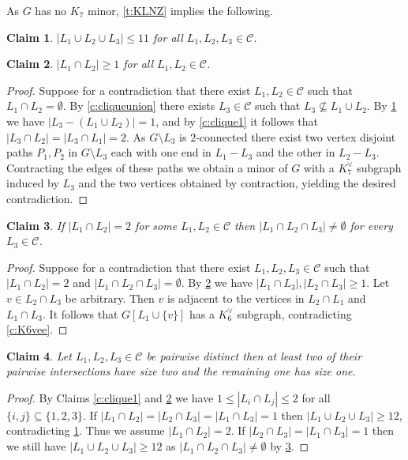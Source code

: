 \documentclass[reqno,final,12pt]{amsart}
\newtheorem{claim}{Claim}[section]
\newcommand{\mc}[1]{\mathcal{#1}}
\begin{document}
{As $G$ has no $K_7$ minor, \cref{t:KLNZ} implies the following.

\begin{claim}\label{c:klnz}  $|L_1 \cup L_2 \cup L_3| \leq 11$ for all $L_1,L_2,L_3 \in \mc{C}$.
\end{claim}	

\begin{claim}\label{c:clique2}  $|L_1 \cap L_2| \geq 1$ for all $L_1,L_2 \in \mc{C}$. 
\end{claim}	
\begin{proof}
Suppose for a contradiction that there exist $L_1,L_2 \in \mc{C}$ such that $L_1 \cap L_2 = \emptyset$. By \cref{c:cliqueunion} there exists $L_3 \in \mc{C}$ such that $L_3 \not \subseteq L_1 \cup L_2$. By \cref{c:klnz} we have $|L_3 - (L_1 \cup L_2)| =1$, and by \cref{c:clique1} it follows that $|L_3 \cap L_2|=|L_3 \cap L_1|=2$. As $G \setminus L_3$ is $2$-connected there exist two vertex disjoint paths $P_1,P_2$ in  $G \setminus L_3$ each with one end in $L_1 - L_3$ and the other in $L_2 - L_3$. Contracting the edges of these paths we obtain a minor of $G$ with a $K_7^{\vee}$ subgraph induced by $L_3$ and the two vertices obtained by contraction, yielding the desired contradiction. 	 
\end{proof}	


\begin{claim}\label{c:clique3} If $|L_1 \cap L_2| = 2$ for some $L_1,L_2 \in \mc{C}$ then $|L_1 \cap L_2 \cap L_3| \neq \emptyset$ for every $L_3 \in \mc{C}$.
\end{claim}	
\begin{proof}
	Suppose for a contradiction that there exist $L_1,L_2,L_3 \in \mc{C}$ such that $|L_1 \cap L_2|=2$ and  $|L_1 \cap L_2 \cap L_3| = \emptyset$. By \cref{c:clique2} we have $|L_1 \cap L_3|,|L_2 \cap L_3| \geq 1$. Let $v \in L_2 \cap L_3$ be arbitrary. Then $v$ is adjacent to the vertices in $L_2 \cap L_1$ and $L_1 \cap L_3$. It follows that $G[L_1 \cup \{v\}]$ has a $K_6^{\vee}$ subgraph, contradicting \cref{c:K6vee}. 
\end{proof}	

\begin{claim}\label{c:clique4} Let $L_1,L_2,L_3 \in \mc{C}$ be pairwise distinct then at least two of their pairwise intersections have size two and the remaining one has size one.
\end{claim}

\begin{proof} By Claims \ref{c:clique1} and \ref{c:clique2} we have $1 \leq |L_i \cap L_j| \leq 2$ for all $\{i,j\} \subseteq \{1,2,3\}$. If $|L_1 \cap L_2|=|L_2 \cap L_3| = |L_1 \cap L_3|=1$ then $|L_1 \cup L_2 \cup L_3| \geq 12$, contradicting \cref{c:klnz}. Thus we assume $|L_1 \cap L_2|=2$. If $|L_2 \cap L_3|=|L_1 \cap L_3| = 1$ then we still have $|L_1 \cup L_2 \cup L_3| \geq 12$ as $|L_1 \cap L_2 \cap L_3| \neq \emptyset$ by \cref{c:clique3}.


\end{proof}}
\end{document}
